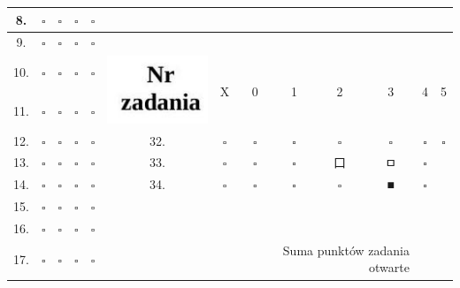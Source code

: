 \documentclass[10pt]{article}
\begin{document}
\begin{center}
\begin{tabular}{|c|c|c|c|c|c|c|c|c|c|c|c|c|}
\hline
8. & \(\square\) & \(\square\) & \(\square\) & \(\square\) &  &  &  &  &  &  &  &  \\
\hline
9. & \(\square\) & \(\square\) & \(\square\) & \(\square\) &  &  &  &  &  &  &  &  \\
\hline
10. & \(\square\) & \(\square\) & \(\square\) & \(\square\) & \multirow[t]{2}{*}{\includegraphics[max width=\textwidth]{2024_11_21_87037534e5fdc524263ag-16(2)}
} & \multirow[t]{2}{*}{X} & \multirow[t]{2}{*}{0} & \multirow[t]{2}{*}{1} & \multirow[t]{2}{*}{2} & \multirow[t]{2}{*}{3} & \multirow[t]{2}{*}{4} & \multirow[t]{2}{*}{5} \\
\hline
11. & \(\square\) & \(\square\) & \(\square\) & \(\square\) &  &  &  &  &  &  &  &  \\
\hline
12. & \(\square\) & \(\square\) & \(\square\) & \(\square\) & 32. & \(\square\) & \(\square\) & \(\square\) & \(\square\) & \(\square\) & \(\square\) & \(\square\) \\
\hline
13. & \(\square\) & \(\square\) & \(\square\) & \(\square\) & 33. & \(\square\) & \(\square\) & \(\square\) & 口 & ㅁ & \(\square\) &  \\
\hline
14. & \(\square\) & \(\square\) & \(\square\) & \(\square\) & 34. & \(\square\) & \(\square\) & \(\square\) & \(\square\) & ■ & \(\square\) &  \\
\hline
15. & \(\square\) & \(\square\) & \(\square\) & \(\square\) &  &  &  &  &  &  &  &  \\
\hline
16. & \(\square\) & \(\square\) & \(\square\) & \(\square\) &  &  &  &  &  &  &  &  \\
\hline
17. & \(\square\) & \(\square\) & \(\square\) & \(\square\) &  &  & \multicolumn{4}{|r|}{\multirow[t]{2}{*}{Suma punktów zadania otwarte}} &  &  \\

\end{tabular}
\end{center}
\end{document}

